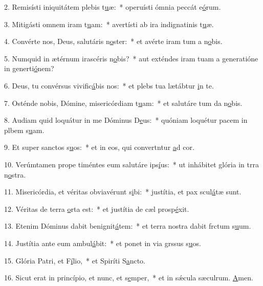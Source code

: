 2. Remisísti iniquitátem plebis t\uline{u}æ:~* operuísti ómnia peccát e\uline{ó}rum.\par 
3. Mitigásti omnem iram t\uline{u}am:~* avertísti ab ira indignatinis t\uline{u}æ.\par 
4. Convérte nos, Deus, salutáris n\uline{o}ster:~* et avérte iram tum a n\uline{o}bis.\par 
5. Numquid in ætérnum irascéris n\uline{o}bis?~* aut exténdes iram tuam a generatióne in generti\uline{ó}nem?\par 
6. Deus, tu convérsus vivific\uline{á}bis nos:~* et plebs tua lætábtur \uline{i}n te.\par 
7. Osténde nobis, Dómine, misericórdiam t\uline{u}am:~* et salutáre tum da n\uline{o}bis.\par 
8. Audiam quid loquátur in me Dóminus D\uline{e}us:~* quóniam loquétur pacem in plbem s\uline{u}am.\par 
9. Et super sanctos s\uline{u}os:~* et in eos, qui convertntur \uline{a}d cor.\par 
10. Verúmtamen prope timéntes eum salutáre ips\uline{í}us:~* ut inhábitet glória in trra n\uline{o}stra.\par 
11. Misericórdia, et véritas obviavérunt s\uline{i}bi:~* justítia, et pax scul\uline{á}tæ sunt.\par 
12. Véritas de terra \uline{o}rta est:~* et justítia de cæl prosp\uline{é}xit.\par 
13. Etenim Dóminus dabit benignit\uline{á}tem:~* et terra nostra dabit frctum s\uline{u}um.\par 
14. Justítia ante eum ambul\uline{á}bit:~* et ponet in via grssus s\uline{u}os.\par 
15. Glória Patri, et F\uline{í}lio,~* et Spiríti S\uline{a}ncto.\par 
16. Sicut erat in princípio, et nunc, et s\uline{e}mper,~* et in sǽcula sæculrum. \uline{A}men.\par 

